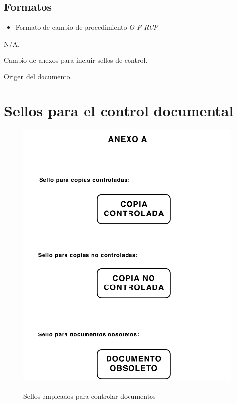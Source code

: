 \subsection{Formatos}
\begin{itemize}
    \item Formato de cambio de procedimiento \emph{O-F-RCP}
\end{itemize}

\begin{changelog}[simple, sectioncmd=\subsection*,label=changelog-1.1]
	\begin{version}[v=3, date=2023--03--06]
		\item N/A.
	\end{version}

	\begin{version}[v=2, date=2022--03--02]
		\item Cambio de anexos para incluir sellos de control.
	\end{version}

    \begin{version}[v=1, date=2021--09--14]
		\item Origen del documento.
	\end{version}
\end{changelog}

\appendix
\newpage
\section{Sellos para el control documental}

\begin{figure}[h!]
    \centering
    \includegraphics[width=0.5\linewidth]{A1.png}
    \label{an1}
    \caption{Sellos empleados para controlar documentos}
\end{figure}

